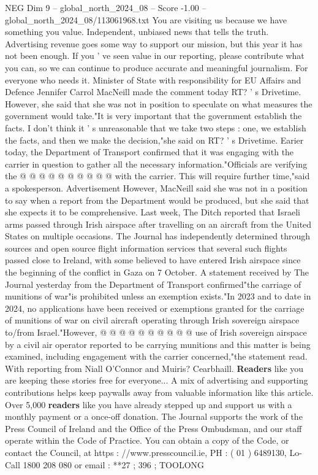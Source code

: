 \begin{textsample}{NEG Dim 9 – global\_north\_2024\_08 – Score -1.00 – global\_north\_2024\_08/113061968.txt}  \label{ex:f9_neg_265}
You are visiting us because we have something you value.
Independent, unbiased news that tells the truth.
Advertising revenue goes some way to support our mission, but this year it has not been enough.
If you ' ve seen value in our reporting, please contribute what you can, so we can continue to produce accurate and meaningful journalism.
For everyone who needs it.
Minister of State with responsibility for EU Affairs and Defence Jennifer Carrol MacNeill made the comment today RT? ' s Drivetime.
However, she said that she was not in position to speculate on what measures the government would take."It is very important that the government establish the facts.
I don't think it ' s unreasonable that we take two steps : one, we establish the facts, and then we make the decision,"she said on RT? ' s Drivetime.
Earier today, the Department of Transport confirmed that it was engaging with the carrier in question to gather all the necessary information."Officials are verifying the @ @ @ @ @ @ @ @ @ @ with the carrier.
This will require further time,"said a spokesperson.
Advertisement However, MacNeill said she was not in a position to say when a report from the Department would be produced, but she said that she expects it to be comprehensive.
Last week, The Ditch reported that Israeli arms passed through Irish airspace after travelling on an aircraft from the United States on multiple occasions.
The Journal has independently determined through sources and open source flight information services that several such flights passed close to Ireland, with some believed to have entered Irish airspace since the beginning of the conflict in Gaza on 7 October.
A statement received by The Journal yesterday from the Department of Transport confirmed"the carriage of munitions of war"is prohibited unless an exemption exists."In 2023 and to date in 2024, no applications have been received or exemptions granted for the carriage of munitions of war on civil aircraft operating through Irish sovereign airspace to/from Israel."However, @ @ @ @ @ @ @ @ @ @ use of Irish sovereign airspace by a civil air operator reported to be carrying munitions and this matter is being examined, including engagement with the carrier concerned,"the statement read.
With reporting from Niall O'Connor and Muiris?
Cearbhaill. \textbf{Readers} like you are keeping these stories free for everyone...
A mix of advertising and supporting contributions helps keep paywalls away from valuable information like this article.
Over 5,000 \textbf{readers} like you have already stepped up and support us with a monthly payment or a once-off donation.
The Journal supports the work of the Press Council of Ireland and the Office of the Press Ombudsman, and our staff operate within the Code of Practice.
You can obtain a copy of the Code, or contact the Council, at https : //www.presscouncil.ie, PH : ( 01 ) 6489130, Lo-Call 1800 208 080 or email : **27 ; 396 ; TOOLONG

\end{textsample}
